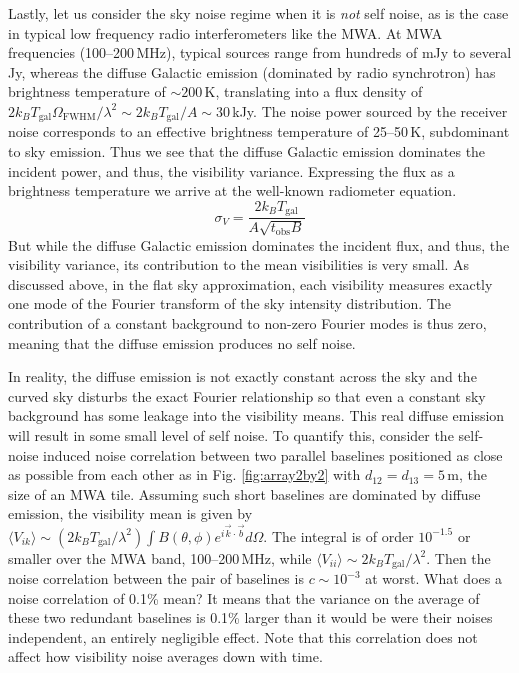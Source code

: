 Lastly, let us consider the sky noise regime when it is \textit{not} self noise, as is the case in typical low frequency radio interferometers like the MWA. At MWA frequencies (100--200\,MHz), typical sources range from hundreds of mJy to several Jy, whereas the diffuse Galactic emission (dominated by radio synchrotron) has brightness temperature of $\sim200$\,K, translating into a flux density of $2 k_B T_\text{gal}\Omega_\text{FWHM}/\lambda^2\sim2 k_B T_\text{gal}/A\sim30$\,kJy. The noise power sourced by the receiver noise corresponds to an effective brightness temperature of 25--50\,K, subdominant to sky emission. Thus we see that the diffuse Galactic emission dominates the incident power, and thus, the visibility variance. Expressing the flux as a brightness temperature we arrive at the well-known radiometer equation.
\begin{equation}
\sigma_V=\frac{2 k_B T_\text{gal}}{A\sqrt{t_\text{obs}B}}
\end{equation}
But while the diffuse Galactic emission dominates the incident flux, and thus, the visibility variance, its contribution to the mean visibilities is very small. As discussed above, in the flat sky approximation, each visibility measures exactly one mode of the Fourier transform of the sky intensity distribution. The contribution of a constant background to non-zero Fourier modes is thus zero, meaning that the diffuse emission produces no self noise. 

In reality, the diffuse emission is not exactly constant across the sky and the curved sky disturbs the exact Fourier relationship so that even a constant sky background has some leakage into the visibility means. This real diffuse emission will result in some small level of self noise. To quantify this, consider the self-noise induced noise correlation between two parallel baselines positioned as close as possible from each other as in Fig. \ref{fig:array2by2} with $d_{12}=d_{13}=5\,\text{m}$, the size of an MWA tile. Assuming such short baselines are dominated by diffuse emission, the visibility mean is given by $\langle V_{ik}\rangle\sim(2k_BT_\text{gal}/\lambda^2)\int B(\theta,\phi)e^{i\vec{k}\cdot\vec{b}}d\Omega$. The integral is of order $10^{-1.5}$ or smaller over the MWA band, 100--200\,MHz, while $\langle V_{ii}\rangle \sim 2k_BT_\text{gal}/\lambda^2$. Then the noise correlation between the pair of baselines is $c\sim10^{-3}$ at worst. What does a noise correlation of 0.1\% mean? It means that the variance on the average of these two redundant baselines is 0.1\% larger than it would be were their noises independent, an entirely negligible effect. Note that this correlation does not affect how visibility noise averages down with time.

